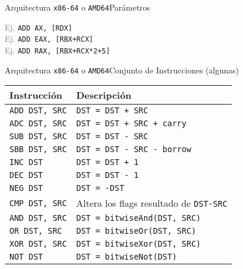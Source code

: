 \documentclass[aspectratio=169]{beamer}
\begin{document}
\begin{frame}[fragile,t]{Arquitectura \texttt{x86-64} o \texttt{AMD64}}{Parámetros}
\begin{textblock}{70}
{    \hspace{0.5cm} \textcolor{gray}{Ej.} \hspace{0.3cm} \textcolor{verdeuca}{\texttt{ADD AX, [RDX]}}\\
    \hspace{0.5cm} \textcolor{gray}{Ej.} \hspace{0.3cm} \textcolor{verdeuca}{\texttt{ADD EAX, [RBX+RCX]}}\\
    \hspace{0.5cm} \textcolor{gray}{Ej.} \hspace{0.3cm} \textcolor{verdeuca}{\texttt{ADD RAX, [RBX+RCX*2+5]}}\\
    }
    \end{textblock}
\end{frame}

\begin{frame}[fragile]{Arquitectura \texttt{x86-64} o \texttt{AMD64}}{Conjunto de Instrucciones (algunas)}
    \begin{tabular}{p{2.7cm}|p{10cm}}
    Instrucción & Descripción \\ \hline
    \texttt{ADD DST, SRC} & \textcolor{verdeuca}{\texttt{DST = DST + SRC}                       }\\
    \texttt{ADC DST, SRC} & \textcolor{verdeuca}{\texttt{DST = DST + SRC + carry}               }\\
    \texttt{SUB DST, SRC} & \textcolor{verdeuca}{\texttt{DST = DST - SRC}                       }\\
    \texttt{SBB DST, SRC} & \textcolor{verdeuca}{\texttt{DST = DST - SRC - borrow}              }\\
    \texttt{INC DST}      & \textcolor{verdeuca}{\texttt{DST = DST + 1}                         }\\
    \texttt{DEC DST}      & \textcolor{verdeuca}{\texttt{DST = DST - 1}                         }\\
    \texttt{NEG DST}      & \textcolor{verdeuca}{\texttt{DST = -DST}                            }\\
    \texttt{CMP DST, SRC} & \textcolor{verdeuca}{Altera los flags resultado de \texttt{DST-SRC} }\\ \hline                  
    \texttt{AND DST, SRC} & \textcolor{verdeuca}{\texttt{DST = bitwiseAnd(DST, SRC)}            }\\
    \texttt{OR  DST, SRC} & \textcolor{verdeuca}{\texttt{DST = bitwiseOr(DST, SRC)}             }\\
    \texttt{XOR DST, SRC} & \textcolor{verdeuca}{\texttt{DST = bitwiseXor(DST, SRC)}            }\\
    \texttt{NOT DST}      & \textcolor{verdeuca}{\texttt{DST = bitwiseNot(DST)}                 }\\
    \hline
    \end{tabular}
\end{frame}
\end{document}
